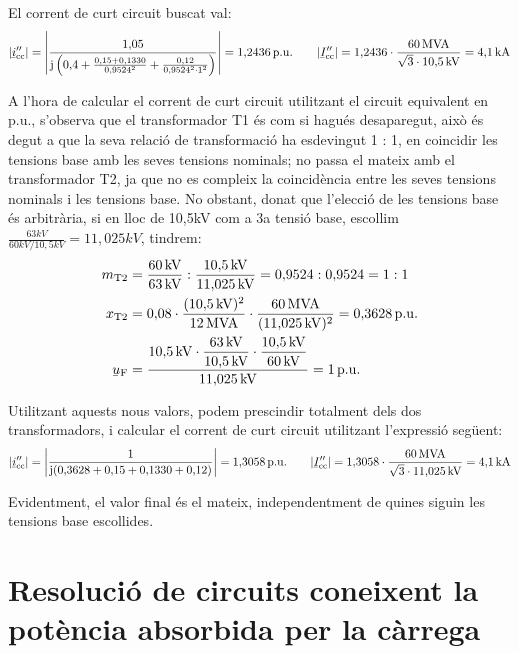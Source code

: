 \begin{exemple}
El corrent de curt circuit buscat val:
\[
|\cmplx{i}''\ped{cc}| = \left| \frac{1{,}05}{\ju \left( 0{,}4 + \frac{0{,}15 + 0{,}1330}{0{,}9524^2} + \frac{0{,}12}{0{,}9524^2 \cdot 1^2} \right)} \right| = 1{,}2436\unit{p.u.} \qquad |\cmplx{I}''\ped{cc}| = 1{,}2436\cdot\frac{60\unit{MVA}}{\sqrt{3}\cdot 10{,}5\unit{kV}} = 4{,}1\unit{kA}
\]

 A l'hora de calcular el corrent de curt circuit utilitzant el circuit equivalent en p.u.,
 s'observa que el transformador T1 \'{e}s com si hagu\'{e}s desaparegut,
 aix\`{o} \'{e}s degut a que la seva relaci\'{o} de transformaci\'{o} ha esdevingut
 1 : 1, en coincidir les tensions base amb les seves tensions nominals;
 no passa el mateix amb el transformador T2, ja que no es compleix
 la coincid\`{e}ncia entre les seves tensions nominals i les tensions
 base. No obstant, donat que l'elecci\'{o} de les tensions base \'{e}s
 arbitr\`{a}ria, si en lloc de 10,5\unit{kV} com a 3a tensi\'{o} base,
 escollim
 $\frac{63\unit{kV}}{60\unit{kV} / 10{,}5\unit{kV}}=11{,}025\unit{kV}$,
 tindrem:
\begin{align*}
   m\ped{T2} &= \frac{60\unit{kV}}{63\unit{kV}} : \frac{10{,}5\unit{kV}}{11{,}025\unit{kV}}
   = 0{,}9524:0{,}9524 = 1:1 \\
   x\ped{T2} &= 0{,}08 \cdot \frac{(10{,}5\unit{kV})^2}{12\unit{MVA}} \cdot
   \frac{60\unit{MVA}}{(11{,}025\unit{kV})^2}  = 0{,}3628\unit{p.u.}\\
   \cmplx{u}\ped{F} &= \frac{10{,}5\unit{kV} \cdot \dfrac{63\unit{kV}}{10{,}5\unit{kV}} \cdot
   \dfrac{10{,}5\unit{kV}}{60\unit{kV}}}{11{,}025\unit{kV}} = 1\unit{p.u.}
\end{align*}

Utilitzant aquests nous valors, podem prescindir totalment dels dos
transformadors, i calcular el corrent de curt circuit utilitzant
l'expressi\'{o} seg\"{u}ent:
\[
|\cmplx{i}''\ped{cc}| = \left| \frac{1}{\ju ( 0{,}3628 + 0{,}15 +
0{,}1330 + 0{,}12 )} \right| = 1{,}3058\unit{p.u.} \qquad
|\cmplx{I}''\ped{cc}| =
1{,}3058\cdot\frac{60\unit{MVA}}{\sqrt{3}\cdot 11{,}025\unit{kV}} =
4{,}1\unit{kA}
\]

Evidentment, el valor final \'{e}s el mateix, independentment de quines
siguin les tensions base escollides.
\end{exemple}

\section{Resoluci\'{o} de circuits coneixent la pot\`{e}ncia absorbida per la
c\`{a}rrega}\label{sec:EZS}

